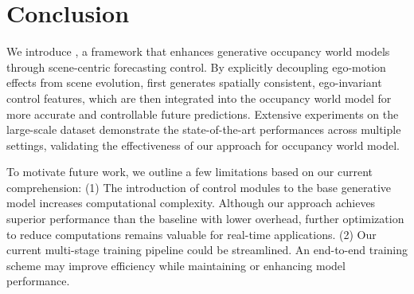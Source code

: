 \section{Conclusion}\label{sec:conclusion}

We introduce \mtd{}, a framework that enhances generative occupancy world models through scene-centric forecasting control.
By explicitly decoupling ego-motion effects from scene evolution, \mtd{} first generates spatially consistent, ego-invariant control features, which are then integrated into the occupancy world model for more accurate and controllable future predictions.
Extensive experiments on the large-scale \occnus{} dataset demonstrate the state-of-the-art performances across multiple settings, validating the effectiveness of our approach for occupancy world model.


To motivate future work, we outline a few limitations based on our current
comprehension: 
(1) The introduction of control modules to the base generative model increases computational complexity. 
Although our approach achieves superior performance than the baseline with lower overhead, further optimization to reduce computations remains valuable for real-time applications.
(2) Our current multi-stage training pipeline could be streamlined. 
An end-to-end training scheme may improve efficiency while maintaining or enhancing model performance.